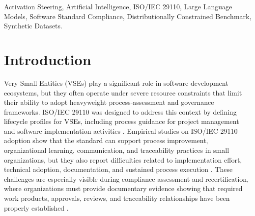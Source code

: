 \documentclass{ieeeaccess}
\begin{document}
\begin{abstract}
exceed both the regex baseline (F1=0.647 on $N=32$) and TF-IDF lexical classifiers (F1=0.63--0.70 under leave-one-group-out cross-validation), suggesting contextual discrimination beyond the evaluated surface-cue baselines---though not establishing human-like semantic reasoning. Given the evaluation set of $N=32$ artifacts, all results are exploratory and hypothesis-generating rather than confirmatory: no improvement is statistically confirmed. The study demonstrates the technical feasibility of evaluating LLM auditing pipelines on a researcher-constructed synthetic benchmark without disclosing industrial data; independent expert labeling, clustered confirmatory testing at larger scale, and evaluation on additional repositories are required before practical auditing claims can be made.
\end{abstract}

\begin{keywords}
Activation Steering, Artificial Intelligence, ISO/IEC 29110, Large Language Models, Software Standard Compliance, Distributionally Constrained Benchmark, Synthetic Datasets.
\end{keywords}

\titlepgskip=-15pt

\maketitle
\hfuzz=10000pt\vfuzz=10000pt


\section{Introduction}
\label{sec:introduction}

Very Small Entities (VSEs) play a significant role in software development ecosystems, but they often operate under severe resource constraints that limit their ability to adopt heavyweight process-assessment and governance frameworks. ISO/IEC 29110 was designed to address this context by defining lifecycle profiles for VSEs, including process guidance for project management and software implementation activities \cite{iso29110_2024, laporte2016vse,laporte2015implementation}. Empirical studies on ISO/IEC 29110 adoption show that the standard can support process improvement, organizational learning, communication, and traceability practices in small organizations, but they also report difficulties related to implementation effort, technical adoption, documentation, and sustained process execution \cite{munoz2020implementations,101145,claudiolapuerta}. These challenges are especially visible during compliance assessment and recertification, where organizations must provide documentary evidence showing that required work products, approvals, reviews, and traceability relationships have been properly established \cite{terronmacias,11276002}.
\end{document}
